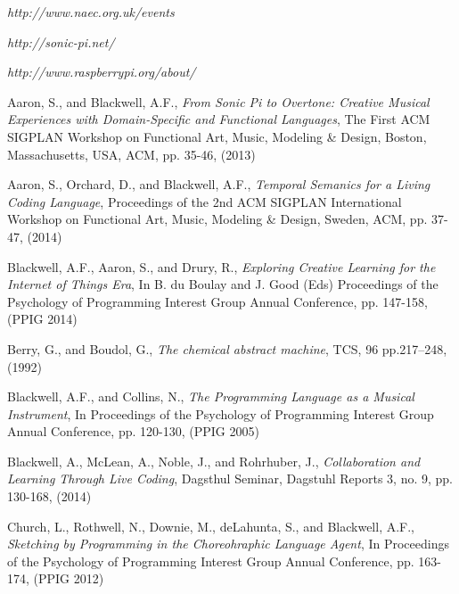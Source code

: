 \documentclass[11pt]{scrartcl}
\begin{document}


\begin{thebibliography}{9}

  \emph{http://www.naec.org.uk/events}

  \emph{http://sonic-pi.net/}

  \emph{http://www.raspberrypi.org/about/}

  Aaron, S., and Blackwell, A.F.,
  \emph{From Sonic Pi to Overtone: Creative Musical Experiences with Domain-Specific and Functional Languages},
  The First ACM SIGPLAN Workshop on Functional Art, Music, Modeling \& Design,
  Boston, Massachusetts, USA,
  ACM, pp. 35-46,
  (2013)

  Aaron, S., Orchard, D., and Blackwell, A.F.,
  \emph{Temporal Semanics for a Living Coding Language},
  Proceedings of the 2nd ACM SIGPLAN International Workshop on Functional Art, Music, Modeling \& Design,
  Sweden, ACM, pp. 37-47,
  (2014)

  Blackwell, A.F., Aaron, S., and Drury, R., 
  \emph{Exploring Creative Learning for the Internet of Things Era},
  In B. du Boulay and J. Good (Eds) Proceedings of the Psychology of Programming Interest Group Annual Conference, 
  pp. 147-158,
  (PPIG 2014)

  Berry, G., and Boudol, G.,
  \emph{The chemical abstract machine},
  TCS, 96 pp.217–248, 
  (1992)

  Blackwell, A.F., and Collins, N.,
  \emph{The Programming Language as a Musical Instrument},
  In Proceedings of the Psychology of Programming Interest Group Annual Conference,
  pp. 120-130,
  (PPIG 2005)

  Blackwell, A., McLean, A., Noble, J., and Rohrhuber, J.,
  \emph{Collaboration and Learning Through Live Coding},
  Dagsthul Seminar, Dagstuhl Reports 3,
  no. 9, pp. 130-168,
  (2014)

  Church, L., Rothwell, N., Downie, M., deLahunta, S., and Blackwell, A.F.,
  \emph{Sketching by Programming in the Choreohraphic Language Agent},
  In Proceedings of the Psychology of Programming Interest Group Annual Conference,
  pp. 163-174,
  (PPIG 2012)


\end{thebibliography}
\end{document}
